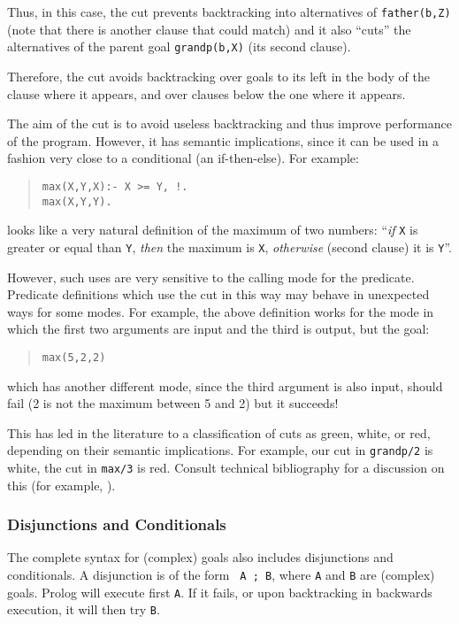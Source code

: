 Thus, in this case, the cut prevents backtracking into alternatives of
\verb+father(b,Z)+ (note that there is another clause that could
match) and it also ``cuts'' the alternatives of the parent goal
\verb+grandp(b,X)+ (its second clause).  

Therefore, the cut avoids backtracking over goals to its left in the
body of the clause where it appears, and over clauses below the one
where it appears.

The aim of the cut is to avoid useless backtracking and thus improve
performance of the program. However, it has semantic implications,
since it can be used in a fashion very close to a conditional (an
if-then-else). For example:
\begin{quote}
\begin{verbatim}
max(X,Y,X):- X >= Y, !.
max(X,Y,Y).
\end{verbatim}
\end{quote}
%
looks like a very natural definition of the maximum of two numbers:
``{\em if} \verb+X+ is greater or equal than \verb+Y+, {\em then} the
maximum is \verb+X+, {\em otherwise} (second clause) it is \verb+Y+''.

However, such uses are very sensitive to the calling mode for the
predicate. Predicate definitions which use the cut in this way may
behave in unexpected ways for some modes. For example, the above
definition works for the mode in which the first two arguments are
input and the third is output, but the goal:
\begin{quote}
\begin{verbatim}
max(5,2,2)
\end{verbatim}
\end{quote}
%
which has another different mode, since the third argument is also
input, should fail (2 is not the maximum between 5 and 2) but it
succeeds!  

This has led in the literature to a classification of cuts as green,
white, or red, depending on their semantic implications. For example,
our cut in \verb+grandp/2+ is white, the cut in \verb+max/3+ is red.
Consult technical bibliography for a discussion on this (for example,
\cite{SterlingShapiro94}). 

\subsubsection{Disjunctions and Conditionals}

The complete syntax for (complex) goals also includes disjunctions and
conditionals. A disjunction is of the form \verb+ A ; B+, where
\verb+A+ and \verb+B+ are (complex) goals. Prolog will execute first
\verb+A+. If it fails, or upon backtracking in backwards execution, it
will then try \verb+B+. 

